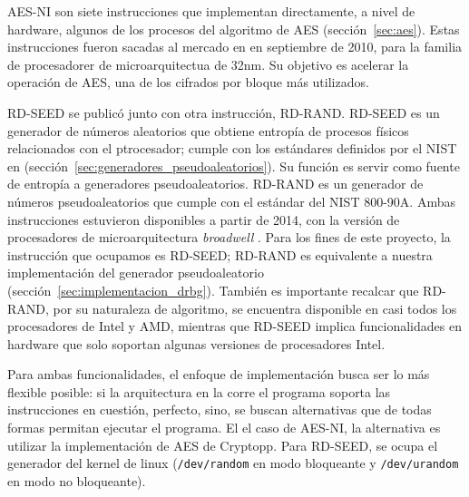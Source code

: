 AES-NI son siete instrucciones que implementan directamente, a nivel de
hardware, algunos de los procesos del algoritmo de AES (sección~\ref{sec:aes}).
Estas instrucciones fueron sacadas al mercado en en septiembre de 2010, para la
familia de procesadorer de microarquitectua de 32nm\cite{aesni_wp}. Su objetivo
es acelerar la operación de AES, una de los cifrados por bloque más
utilizados.

RD-SEED se publicó junto con otra instrucción, RD-RAND. RD-SEED es un generador
de números aleatorios que obtiene entropía de procesos físicos relacionados con
el ptrocesador; cumple con los estándares definidos por el NIST en
\cite{nist_aleatorios} (sección~\ref{sec:generadores_pseudoaleatorios}). Su
función es servir como fuente de entropía a generadores pseudoaleatorios.
RD-RAND es un generador de números pseudoaleatorios que cumple con el estándar
del NIST 800-90A. Ambas instrucciones estuvieron disponibles a partir de 2014,
con la versión de procesadores de microarquitectura \textit{broadwell}
\cite{aesni_wp}. Para los fines de este proyecto, la instrucción que ocupamos
es RD-SEED; RD-RAND es equivalente a nuestra implementación del generador
pseudoaleatorio (sección~\ref{sec:implementacion_drbg}). También es importante
recalcar que RD-RAND, por su naturaleza de algoritmo, se encuentra disponible en
casi todos los procesadores de Intel y AMD, mientras que RD-SEED implica
funcionalidades en hardware que solo soportan algunas versiones de procesadores
Intel.

Para ambas funcionalidades, el enfoque de implementación busca ser lo más
flexible posible: si la arquitectura en la corre el programa soporta las
instrucciones en cuestión, perfecto, sino, se buscan alternativas que de todas
formas permitan ejecutar el programa. El el caso de AES-NI, la alternativa es
utilizar la implementación de AES de Cryptopp. Para RD-SEED, se ocupa el
generador del kernel de linux (\texttt{/dev/random} en modo bloqueante y
\texttt{/dev/urandom} en modo no bloqueante).
